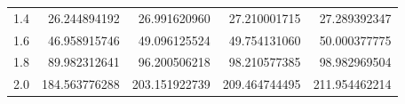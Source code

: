 \begin{examplesolution}
\begin{newtable}
\begin{center}
\begin{tabular}{|c|r|r|r|r|}
      1.4                       & 26.244894192                  & 26.991620960                  & 27.210001715                   & 27.289392347                    \\
      1.6                       & 46.958915746                  & 49.096125524                  & 49.754131060                   & 50.000377775                    \\
      1.8                       & 89.982312641                  & 96.200506218                  & 98.210577385                   & 98.982969504                    \\
      2.0                       & 184.563776288                 & 203.151922739                 & 209.464744495                  & 211.954462214                   \\
      \hline
    \end{tabular}
  \end{center}
\end{newtable}


\end{examplesolution}

